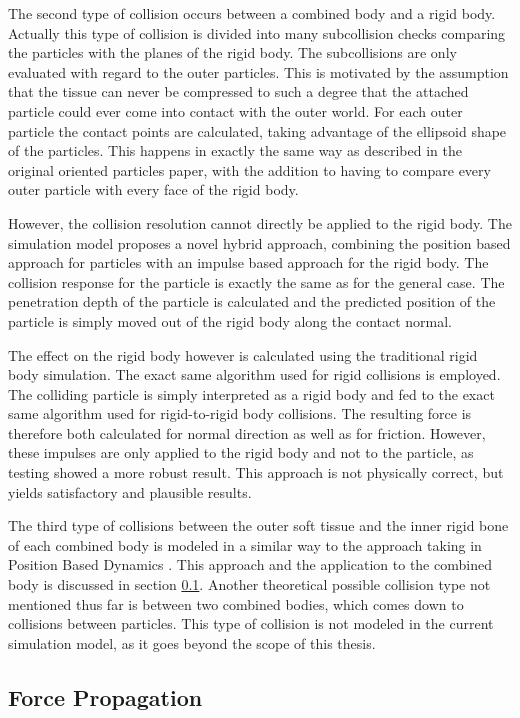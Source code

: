 The second type of collision occurs between a combined body and a rigid body. Actually this type of collision is divided into many subcollision checks comparing the particles with the planes of the rigid body. The subcollisions are only evaluated with regard to the outer particles. This is motivated by the assumption that the tissue can never be compressed to such a degree that the attached particle could ever come into contact with the outer world. For each outer particle the contact points are calculated, taking advantage of the ellipsoid shape of the particles. This happens in exactly the same way as described in the original oriented particles paper, with the addition to having to compare every outer particle with every face of the rigid body. 

However, the collision resolution cannot directly be applied to the rigid body. The simulation model proposes a novel hybrid approach, combining the position based approach for particles with an impulse based approach for the rigid body. The collision response for the particle is exactly the same as for the general case. The penetration depth of the particle is calculated and the predicted position of the particle is simply moved out of the rigid body along the contact normal.

The effect on the rigid body however is calculated using the traditional rigid body simulation. The exact same algorithm used for rigid collisions is employed. The colliding particle is simply interpreted as a rigid body and fed to the exact same algorithm used for rigid-to-rigid body collisions. The resulting force is therefore both calculated for normal direction as well as for friction. However, these impulses are only applied to the rigid body and not to the particle, as testing showed a more robust result. This approach is not physically correct, but yields satisfactory and plausible results.

The third type of collisions between the outer soft tissue and the inner rigid bone of each combined body is modeled in a similar way to the approach taking in Position Based Dynamics \cite{Muller:2007vs}. This approach and the application to the combined body is discussed in section \ref{subsec:force_propagation}. Another theoretical possible collision type not mentioned thus far is between two combined bodies, which comes down to collisions between particles. This type of collision is not modeled in the current simulation model, as it goes beyond the scope of this thesis.

\subsection{Force Propagation}
\label{subsec:force_propagation}

